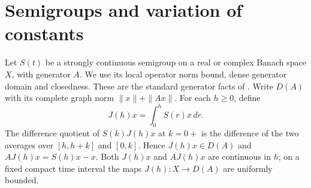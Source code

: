 \documentclass[11pt,oneside,openany]{book}
\theoremstyle{plain}
\theoremstyle{definition}
\theoremstyle{remark}
\begin{document}
\section{Semigroups and variation of constants}
\label{pde:C07}

Let \(S(t)\) be a strongly continuous semigroup on a real or
complex Banach space \(X\), with generator \(A\). We use its
local operator norm bound, dense generator domain and closedness.
These are the standard generator facts of
\cite[Chapter II]{EngelNagel}\cite{D16}.
Write \(D(A)\) with its complete graph norm \(\|x\|+\|Ax\|\).
For each \(h\ge0\), define
\[
 J(h)x=\int_0^h S(r)x\,dr.
\]
The difference quotient of \(S(k)J(h)x\) at \(k=0+\) is the
difference of the two averages over \([h,h+k]\) and \([0,k]\).
Hence \(J(h)x\in D(A)\) and \(AJ(h)x=S(h)x-x\).
Both \(J(h)x\) and \(AJ(h)x\) are continuous in \(h\);
on a fixed compact time interval the maps
\(J(h):X\to D(A)\) are uniformly bounded.
\end{document}
